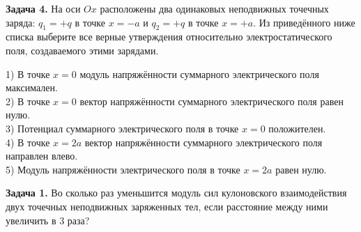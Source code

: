 \begin{taskbasic}[code={\label{task:elem_coulomb_v12_n14}}]
\textbf{Задача 4.} На оси $Ox$ расположены два одинаковых неподвижных точечных заряда: $q_1 = +q$ в точке $x = -a$ и $q_2 = +q$ в точке $x = +a$. Из приведённого ниже списка выберите все верные утверждения относительно электростатического поля, создаваемого этими зарядами.

\nopagebreak\smallskip
\begin{center}
\end{center}

1) В точке $x = 0$ модуль напряжённости суммарного электрического поля максимален.\\
2) В точке $x = 0$ вектор напряжённости суммарного электрического поля равен нулю.\\
3) Потенциал суммарного электрического поля в точке $x = 0$ положителен.\\
4) В точке $x = 2a$ вектор напряжённости суммарного электрического поля направлен влево.\\
5) Модуль напряжённости электрического поля в точке $x = 2a$ равен нулю.

\end{taskbasic}


\begin{taskbasic}[code={\label{task:elem_coulomb_v15_n11}}]
\textbf{Задача 1.} Во сколько раз уменьшится модуль сил кулоновского взаимодействия двух точечных неподвижных заряженных тел, если расстояние между ними увеличить в $3$ раза?

\end{taskbasic}

